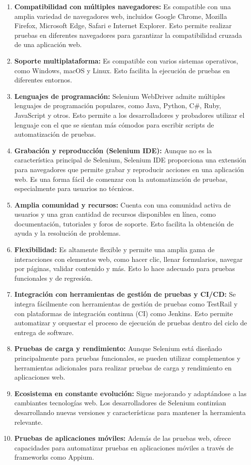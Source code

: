 \documentclass[letterpaper]{article}
\begin{document}
\begin{enumerate}[series=listWWNumix,label=\arabic*.,ref=\arabic*]
\item \textbf{Compatibilidad con múltiples navegadores:} Es compatible con una amplia variedad de navegadores web,
incluidos Google Chrome, Mozilla Firefox, Microsoft Edge, Safari e Internet Explorer. Esto permite realizar pruebas en
diferentes navegadores para garantizar la compatibilidad cruzada de una aplicación web.
\item \textbf{Soporte multiplataforma:} Es compatible con varios sistemas operativos, como Windows, macOS y Linux. Esto
facilita la ejecución de pruebas en diferentes entornos.
\item \textbf{Lenguajes de programación:} Selenium WebDriver admite múltiples lenguajes de programación populares, como
Java, Python, C\#, Ruby, JavaScript y otros. Esto permite a los desarrolladores y probadores utilizar el lenguaje con
el que se sientan más cómodos para escribir scripts de automatización de pruebas.
\item \textbf{Grabación y reproducción (Selenium IDE):} Aunque no es la característica principal de Selenium, Selenium
IDE proporciona una extensión para navegadores que permite grabar y reproducir acciones en una aplicación web. Es una
forma fácil de comenzar con la automatización de pruebas, especialmente para usuarios no técnicos.
\item \textbf{Amplia comunidad y recursos:} Cuenta con una comunidad activa de usuarios y una gran cantidad de recursos
disponibles en línea, como documentación, tutoriales y foros de soporte. Esto facilita la obtención de ayuda y la
resolución de problemas.
\item \textbf{Flexibilidad:} Es altamente flexible y permite una amplia gama de interacciones con elementos web, como
hacer clic, llenar formularios, navegar por páginas, validar contenido y más. Esto lo hace adecuado para pruebas
funcionales y de regresión.
\item \textbf{Integración con herramientas de gestión de pruebas y CI/CD:} Se integra fácilmente con herramientas de
gestión de pruebas como TestRail y con plataformas de integración continua (CI) como Jenkins. Esto permite automatizar
y orquestar el proceso de ejecución de pruebas dentro del ciclo de entrega de software.
\item \textbf{Pruebas de carga y rendimiento:} Aunque Selenium está diseñado principalmente para pruebas funcionales, se
pueden utilizar complementos y herramientas adicionales para realizar pruebas de carga y rendimiento en aplicaciones
web.
\item \textbf{Ecosistema en constante evolución:} Sigue mejorando y adaptándose a las cambiantes tecnologías web. Los
desarrolladores de Selenium continúan desarrollando nuevas versiones y características para mantener la herramienta
relevante.
\item \textbf{Pruebas de aplicaciones móviles:} Además de las pruebas web, ofrece capacidades para automatizar pruebas
en aplicaciones móviles a través de frameworks como Appium.
\end{enumerate}
\end{document}
